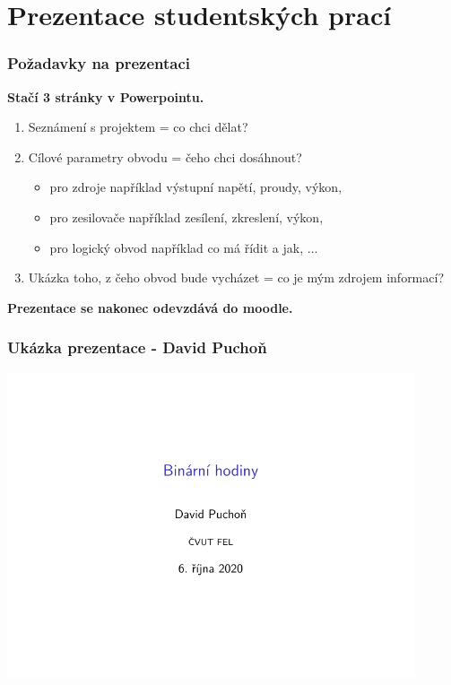\documentclass{beamer}
\begin{document}
\section{\texorpdfstring{Prezentace studentských prací}{Prezentace studentskych praci}}
\begin{frame}
    \frametitle{Požadavky na prezentaci}
		
    \textbf{Stačí 3 stránky v Powerpointu.}
    \begin{enumerate}
      \item Seznámení s projektem = co chci dělat?
      \item Cílové parametry obvodu = čeho chci dosáhnout?
			
			\begin{itemize}
				\item pro zdroje například výstupní napětí, proudy, výkon,
				\item pro zesilovače například zesílení, zkreslení, výkon,
				\item pro logický obvod například co má řídit a jak, ...
			\end{itemize}
			
			\item Ukázka toho, z čeho obvod bude vycházet = co je mým zdrojem informací?
			
    \end{enumerate}
		
		\textbf{Prezentace se nakonec odevzdává do moodle.}
	
	\end{frame}
	\begin{frame}
    \frametitle{Ukázka prezentace - David Puchoň}
		
		\includegraphics[page=1,width=0.9\textwidth]{pdf/KEO-David_Puchon-Prezentace.pdf}
	
	\end{frame}
\end{document}
